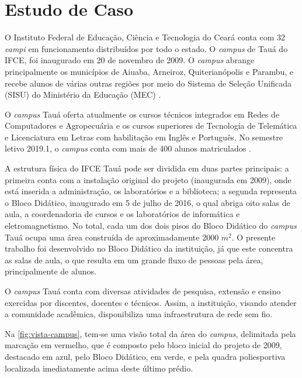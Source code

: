 \section{Estudo de Caso}
\label{sec:estudo-de-caso}

O Instituto Federal de Educação, Ciência e Tecnologia do Ceará conta com 32 \textit{campi} em funcionamento distribuídos por todo o estado. O \textit{campus} de Tauá do IFCE, foi inaugurado em 20 de novembro de 2009. O \textit{campus} abrange principalmente os municípios de Aiuaba, Arneiroz, Quiterianópolis e Parambu, e recebe alunos de várias outras regiões por meio do Sistema de Seleção Unificada (SISU) do Ministério da Educação (MEC) \cite{ifceTaua2019}.

O \textit{campus} Tauá oferta atualmente os cursos técnicos integrados em Redes de Computadores e Agropecuária e os cursos superiores de Tecnologia de Telemática e Licenciatura em Letras com habilitação em Inglês e Português. No semestre letivo 2019.1, o \textit{campus} conta com mais de 400 alunos matriculados \cite{ifceTaua2019}.

A estrutura física do IFCE Tauá pode ser dividida em duas partes principais: a primeira conta com a instalação original do projeto (inaugurada em 2009), onde está inserida a administração, os laboratórios e a biblioteca; a segunda representa o Bloco Didático, inaugurado em 5 de julho de 2016, o qual abriga oito salas de aula, a coordenadoria de cursos e os laboratórios de informática e eletromagnetismo. No total, cada um dos dois pisos do Bloco Didático do \textit{campus} Tauá ocupa uma área construída de aproximadamente 2000 $m^{2}$. O presente trabalho foi desenvolvido no Bloco Didático da instituição, já que este concentra as salas de aula, o que resulta em um grande fluxo de pessoas pela área, principalmente de alunos.

O \textit{campus} Tauá conta com diversas atividades de pesquisa, extensão e ensino exercidas por discentes, docentes e técnicos. Assim, a instituição, visando atender a comunidade acadêmica, disponibiliza uma infraestrutura de rede sem fio.

Na \autoref{fig:vista-campus}, tem-se uma visão total da área do \textit{campus}, delimitada pela marcação em vermelho, que é composto pelo bloco inicial do projeto de 2009, destacado em azul, pelo Bloco Didático, em verde, e pela quadra poliesportiva localizada imediatamente acima deste último prédio.

